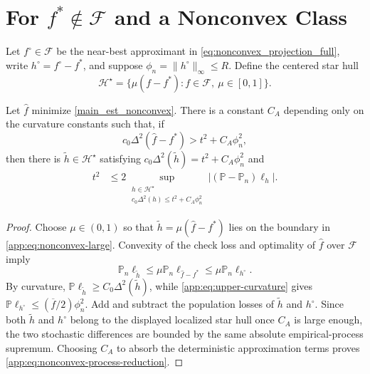 \documentclass[twoside,11pt]{article}
\newenvironment{revision}{\color{revisionred}}{}
\begin{document}
\begin{revision}
\section{For \texorpdfstring{$f^*\notin\mathcal F$}{f* not in F} and a Nonconvex Class}
\label{app:nonconvex}

Let $f^\circ\in\mathcal F$ be the near-best approximant in
\eqref{eq:nonconvex_projection_full}, write $h^\circ=f^\circ-f^*$, and suppose
$\phi_n=\|h^\circ\|_\infty\le R$.  Define the centered star hull
\[
 \mathcal H^\star=\{\mu(f-f^*):f\in\mathcal F,\ \mu\in[0,1]\}.
\]

\begin{lemma}
\label{app:lem:nonconvex-localization}
Let $\widehat f$ minimize \eqref{main_est_nonconvex}.  There is a constant
$C_A$ depending only on the curvature constants such that, if
\begin{equation}
 c_0\Delta^2(\widehat f-f^*)>t^2+C_A\phi_n^2,                  \label{app:eq:nonconvex-large}
\end{equation}
then there is $\widetilde h\in\mathcal H^\star$ satisfying
$c_0\Delta^2(\widetilde h)=t^2+C_A\phi_n^2$ and
\begin{align}
 t^2
 &\le 2\sup_{\substack{h\in\mathcal H^\star\\
 c_0\Delta^2(h)\le t^2+C_A\phi_n^2}}
 |(\mathbb P-\mathbb P_n)\ell_h|.                              \label{app:eq:nonconvex-process-reduction}
\end{align}
\end{lemma}

\begin{proof}
Choose $\mu\in(0,1)$ so that
$\widetilde h=\mu(\widehat f-f^*)$ lies on the boundary in
\eqref{app:eq:nonconvex-large}.  Convexity of the check loss and optimality of
$\widehat f$ over $\mathcal F$ imply
\[
 \mathbb P_n\ell_{\widetilde h}
 \le\mu\mathbb P_n\ell_{\widehat f-f^*}
 \le\mu\mathbb P_n\ell_{h^\circ}.
\]
By curvature,
$\mathbb P\ell_{\widetilde h}\ge C_0\Delta^2(\widetilde h)$, while
\eqref{app:eq:upper-curvature} gives
$\mathbb P\ell_{h^\circ}\le(\overline f/2)\phi_n^2$.  Add and subtract the
population losses of $\widetilde h$ and $h^\circ$.  Since both
$\widetilde h$ and $h^\circ$ belong to the displayed localized star hull once
$C_A$ is large enough, the two stochastic differences are bounded by the same
absolute empirical-process supremum.  Choosing $C_A$ to absorb the deterministic
approximation terms proves \eqref{app:eq:nonconvex-process-reduction}.
\end{proof}


\end{revision}
\end{document}
